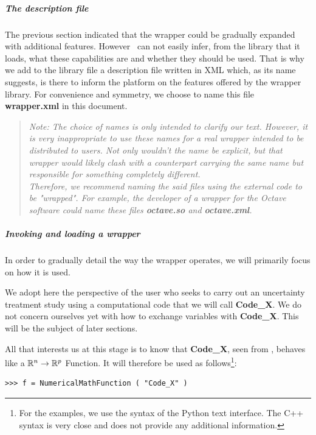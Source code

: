 \subparagraph{The description file}
The previous section indicated that the wrapper could be gradually expanded with additional features. However \OT\ can not easily infer, from the library that it loads, what these capabilities are and whether they should be used. That is why we add to the library file a description file written in XML which, as its name suggests, is there to inform the platform on the features offered by the wrapper library. For convenience and symmetry, we choose to name this file {\bf wrapper.xml} in this document.

\small
\begin{quote}
\textit{Note: The choice of names is only intended to clarify our text. However, it is very inappropriate to use these names for a real wrapper intended to be distributed to users. Not only wouldn't the name be explicit, but that wrapper would likely clash with a counterpart carrying the same name but responsible for something completely different.\\
Therefore, we recommend naming the said files using the external code to be "wrapped". For example, the developer of a wrapper for the Octave software could name these files {\bf octave.so} and {\bf octave.xml}.}
\end{quote}
\normalsize

\subparagraph{Invoking and loading a wrapper}

In order to gradually detail the way the wrapper operates, we will primarily focus on how it is used.

We adopt here the perspective of the user who seeks to carry out an uncertainty treatment study using a computational code that we will call {\bf Code\_X}. We do not concern ourselves yet with how to exchange variables with {\bf Code\_X}. This will be the subject of later sections.

All that interests us at this stage is to know that {\bf Code\_X}, seen from \OT, behaves like a ${\mathbb R}^{n} \to {\mathbb R}^{p}$ Function. It will therefore be used as follows\footnote{For the examples, we use the syntax of the Python text interface. The C++ syntax is very close and does not provide any additional information.}:
\lstset{language=Python, basicstyle=\normalsize}
\begin{lstlisting}[frame=TBRL]
>>> f = NumericalMathFunction ( "Code_X" )
\end{lstlisting}

